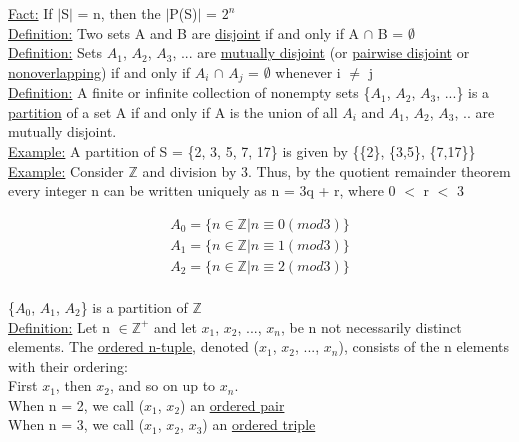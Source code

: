 \documentclass{article}
\begin{document}
\underline{Fact:} If $|$S$|$ = n, then the $|$P(S)$|$ = $2^{n}$ \\

\underline{Definition:} Two sets A and B are \underline{disjoint} if and only if A $\cap$ B = $\emptyset$ \\

\underline{Definition:} Sets $A_{1}$,  $A_{2}$,  $A_{3}$, ... are \underline{mutually disjoint} (or \underline{pairwise disjoint} or 
\underline{nonoverlapping}) if and only if $A_{i}$ $\cap$ $A_{j}$ = $\emptyset$ whenever i $\neq$ j \\

\underline{Definition:} A finite or infinite collection of nonempty sets \{$A_{1}$, $A_{2}$, $A_{3}$, ...\} is a \underline{partition}
of a set A if and only if A is the union of all $A_{i}$ and $A_{1}$, $A_{2}$, $A_{3}$, .. are mutually disjoint. \\

\underline{Example:} A partition of S = \{2, 3, 5, 7, 17\} is given by \{\{2\}, \{3,5\}, \{7,17\}\} \\

\underline{Example:} Consider $\mathbb{Z}$ and division by 3. Thus, by the quotient remainder theorem every integer n can be written uniquely as n = 3q + r, where 0 $<$ r $<$ 3

\begin{align}
A_{0} = \{n \in \mathbb{Z} | n \equiv 0 (mod 3)\} \\ 
A_{1} = \{n \in \mathbb{Z} | n \equiv 1 (mod 3)\} \\ 
A_{2} = \{n \in \mathbb{Z} | n \equiv 2 (mod 3)\} \\ 
\end{align}

\{$A_{0}$, $A_{1}$, $A_{2}$\} is a partition of $\mathbb{Z}$ \\

\underline{Definition:} Let n $\in \mathbb{Z}^{+}$ and let $x_{1}$, $x_{2}$, ..., $x_{n}$, be n not necessarily distinct elements.
The \underline{ordered n-tuple}, denoted ($x_{1}$, $x_{2}$, ..., $x_{n}$), consists of the n elements with their ordering: \\

First $x_{1}$, then $x_{2}$, and so on up to $x_{n}$. \\

When n = 2, we call ($x_{1}$, $x_{2}$) an \underline{ordered pair} \\

When n = 3, we call ($x_{1}$, $x_{2}$, $x_{3}$) an \underline{ordered triple} \\
\end{document}
